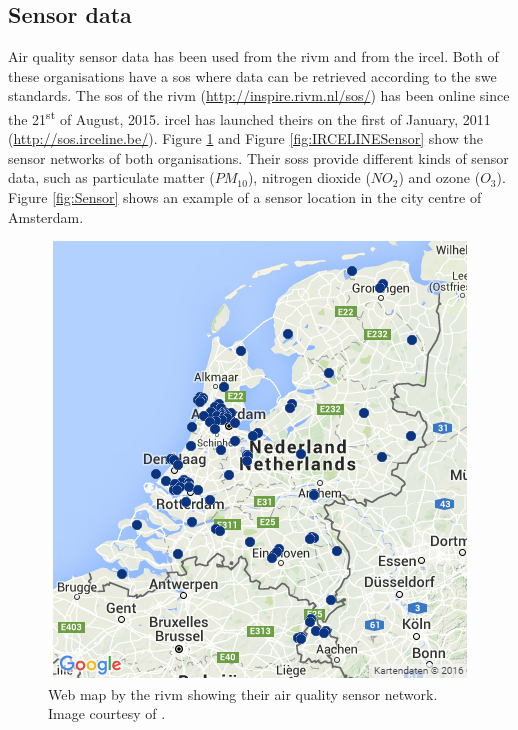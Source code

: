 \subsection{Sensor data}
\label{sensor}
\begin{sloppypar}
Air quality sensor data has been used from the \acf{rivm} and from the \acf{ircel}. Both of these organisations have a \ac{sos} where data can be retrieved according to the \ac{swe} standards. The \ac{sos} of the \ac{rivm} (\url{http://inspire.rivm.nl/sos/}) has been online since the 21\textsuperscript{st} of August, 2015. \ac{ircel} has launched theirs on the first of January, 2011 (\url{http://sos.irceline.be/}). Figure \ref{fig:RIVMSensor} and Figure \ref{fig:IRCELINESensor} show the sensor networks of both organisations. Their \aclp{sos} provide different kinds of sensor data, such as particulate matter ($PM_{10}$), nitrogen dioxide ($NO_{2}$) and ozone ($O_{3}$). Figure \ref{fig:Sensor} shows an example of a sensor location in the city centre of Amsterdam. 
\end{sloppypar}


\begin{figure}
	\centering
	\includegraphics[width=0.8\linewidth]{figs/RIVMSensors.png}
	\caption{Web map by the \acf*{rivm} showing their air quality sensor network. Image courtesy of \cite{DATA:RIVM}.}
	\label{fig:RIVMSensor}
\end{figure}

